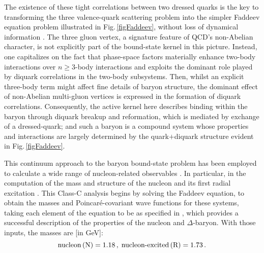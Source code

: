 The existence of these tight correlations between two dressed quarks is the key to transforming the three valence-quark scattering problem into the simpler Faddeev equation problem illustrated in Fig.\,\ref{figFaddeev}, without loss of dynamical information \cite{Eichmann:2009qa}.   The three gluon vertex, a signature feature of QCD's non-Abelian character, is not explicitly part of the bound-state kernel in this picture.  Instead, one capitalizes on the fact that phase-space factors materially enhance two-body interactions over $n\geq 3$-body interactions and exploits the dominant role played by diquark correlations in the two-body subsystems.  Then, whilst an explicit three-body term might affect fine details of baryon structure, the dominant effect of non-Abelian multi-gluon vertices is expressed in the formation of diquark correlations.  Consequently, the active kernel here describes binding within the baryon through diquark breakup and reformation, which is mediated by exchange of a dressed-quark; and such a baryon is a compound system whose properties and interactions are largely determined by the quark$+$diquark structure evident in Fig.\,\ref{figFaddeev}.

This continuum approach to the baryon bound-state problem has been employed to calculate a wide range of nucleon-related observables \cite{Wilson:2011aa, Chang:2012cc, Roberts:2013mja, Segovia:2014aza, Roberts:2015dea, Xu:2015kta, Segovia:2016zyc, Eichmann:2016yit}.  In particular, in the computation of the mass and structure of the nucleon and its first radial excitation \cite{Segovia:2015hra}.  This Class-C analysis begins by solving the Faddeev equation, to obtain the masses and Poincar\'e-covariant wave functions for these systems,
taking each element of the equation to be as specified in \cite{Segovia:2014aza}, which provides a successful description of the properties of the nucleon and $\Delta$-baryon.  With those inputs, the masses are [in GeV]:
\begin{equation}
\label{eqMasses}
\mbox{nucleon\,(N)} = 1.18\,,\;
\mbox{nucleon-excited\,(R)} = 1.73\,.
\end{equation}

